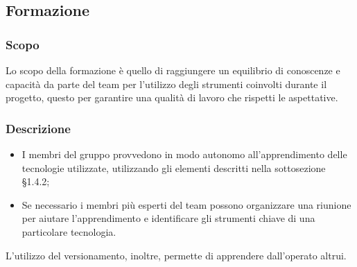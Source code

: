 \subsection{Formazione}

\subsubsection{Scopo}
Lo scopo della formazione è quello di raggiungere un equilibrio di conoscenze e capacità da parte del team per l'utilizzo degli strumenti coinvolti durante il progetto, questo per garantire una qualità di lavoro che rispetti le aspettative.

\subsubsection{Descrizione}
\begin{itemize}
	\item I membri del gruppo provvedono in modo autonomo all'apprendimento delle tecnologie utilizzate, utilizzando gli elementi descritti nella sottosezione §1.4.2;
	\item Se necessario i membri più esperti del team possono organizzare una riunione per aiutare l'apprendimento e identificare gli strumenti chiave di una particolare tecnologia.
\end{itemize}
L'utilizzo del versionamento, inoltre, permette di apprendere dall'operato altrui.

